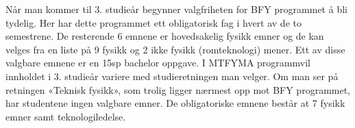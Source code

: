 Når man kommer til 3. studieår begynner valgfriheten for BFY programmet å bli tydelig. Her har dette programmet ett obligatorisk fag i hvert av de to semestrene. De resterende 6 emnene er hovedsakelig fysikk emner og de kan velges fra en liste på 9 fysikk og 2 ikke fysikk (romteknologi) mener. Ett av disse valgbare emnene er en 15sp bachelor oppgave. I MTFYMA programmvil innholdet i 3. studieår variere med studieretningen man velger. Om man ser på retningen «Teknisk fysikk», som trolig ligger nærmest opp mot BFY programmet, har studentene ingen valgbare emner. De obligatoriske emnene består at 7 fysikk emner samt teknologiledelse. 


